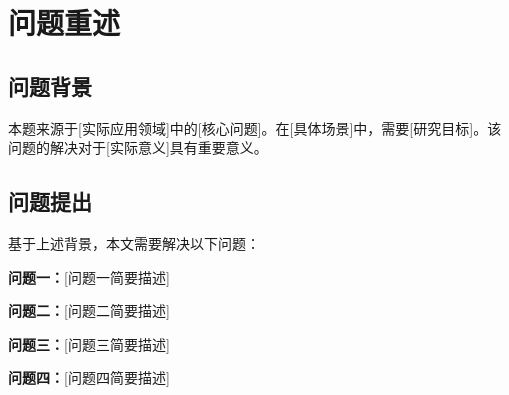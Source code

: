 
\section{问题重述}

\subsection{问题背景}

本题来源于[实际应用领域]中的[核心问题]。在[具体场景]中，需要[研究目标]。该问题的解决对于[实际意义]具有重要意义。

\subsection{问题提出}

基于上述背景，本文需要解决以下问题：

\textbf{问题一：}[问题一简要描述]

\textbf{问题二：}[问题二简要描述]

\textbf{问题三：}[问题三简要描述]

\textbf{问题四：}[问题四简要描述]
